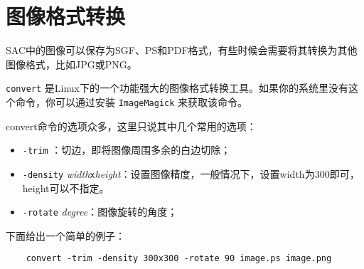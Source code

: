 \section{图像格式转换}
\label{sec:format-conversion}

SAC中的图像可以保存为SGF、PS和PDF格式，有些时候会需要将其转换为其他图像格式，比如JPG或PNG。

\texttt{convert} 是Linux下的一个功能强大的图像格式转换工具。如果你的系统里没有这个命令，你可以通过安装 \texttt{ImageMagick} 来获取该命令。

convert命令的选项众多，这里只说其中几个常用的选项：

\begin{itemize}
\item \texttt{-trim} ：切边，即将图像周围多余的白边切除；
\item \texttt{-density}  \textit{width}\texttt{x}\textit{height}：设置图像精度，一般情况下，设置width为300即可，height可以不指定。
\item \texttt{-rotate}  \textit{degree}：图像旋转的角度；
\end{itemize}

下面给出一个简单的例子：

\begin{verbatim}
    convert -trim -density 300x300 -rotate 90 image.ps image.png
\end{verbatim}